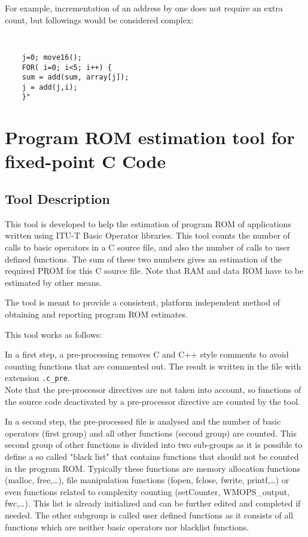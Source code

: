 For example, incrementation of an address by one does not require an
extra count, but followings would be considered complex:
{\tt\small
\begin{verbatim}
    j=0; move16();
    FOR( i=0; i<5; i++) {
    sum = add(sum, array[j]);
    j = add(j,i);
    }"
\end{verbatim}
} %

\section{Program ROM estimation tool for fixed-point C Code}

\subsection{Tool Description }
This tool is developed to help the estimation of program ROM of
applications written using ITU-T Basic Operator libraries. This tool
counts the number of calls to basic operators in a C source file, and
also the number of calls to user defined functions. The sum of these
two numbers gives an estimation of the required PROM for this C source
file. Note that RAM and data ROM have to be estimated by other means.

The tool is meant to provide a consistent, platform independent method
of obtaining and reporting program ROM estimates.

This tool works as follows:
\begin{list}{-}
    \item In a first step, a pre-processing removes C and C++ style
    comments to avoid counting functions that are commented out. The
    result is written in the file with extension {\tt .c\_pre}.\\
    Note that the pre-processor directives are not taken into account,
    so functions of the source code deactivated by a pre-processor
    directive are counted by the tool.
    \item In a second step, the pre-processed file is analysed and the
    number of basic operators (first group) and all other functions
    (second group) are counted. This second group of other functions is
    divided into two sub-groups as it is possible to define a so called
    "black list" that contains functions that should not be counted in
    the program ROM. Typically these functions are memory allocation
    functions (malloc, free,\dots), file manipulation functions (fopen,
    fclose, fwrite, printf,\dots) or even functions related to complexity
    counting (setCounter, WMOPS\_output, fwc,\dots). This list is
    already initialized and can be further edited and completed if
    needed. The other subgroup is called user defined functions as it
    consists of all functions which are neither basic operators nor
    blacklist functions.
\end{list}

